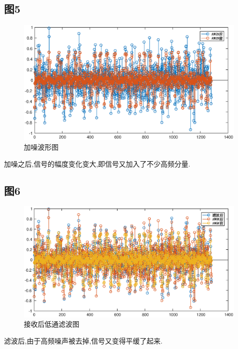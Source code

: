 \documentclass[UTF8]{article}
\begin{document}
\begin{CJK}{UTF8}{gkai}
\subsection{图5}
\begin{figure}[H]
    \centering
    \includegraphics[scale=0.7]{plot5.eps}
    \caption{加噪波形图}
    \label{blocks}
\end{figure}
加噪之后,信号的幅度变化变大,即信号又加入了不少高频分量.
\subsection{图6}
\begin{figure}[H]
    \centering
    \includegraphics[scale=0.7]{plot6.eps}
    \caption{接收后低通滤波图}
    \label{blocks}
\end{figure}
滤波后,由于高频噪声被去掉,信号又变得平缓了起来.

\end{CJK}
\end{document}
